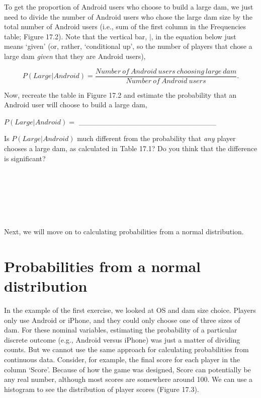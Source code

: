 \documentclass[
  openany]{krantz}
\begin{document}
To get the proportion of Android users who choose to build a large dam, we just need to divide the number of Android users who chose the large dam size by the total number of Android users (i.e., sum of the first column in the Frequencies table; Figure 17.2).
Note that the vertical bar, \(|\), in the equation below just means `given' (or, rather, `conditional up', so the number of players that chose a large dam \emph{given} that they are Android users),

\[P(Large | Android) = \frac{Number\:of\:Android\:users\:choosing\:large\:dam}{Number\:of\:Android\:users}.\]

Now, recreate the table in Figure 17.2 and estimate the probability that an Android user will choose to build a large dam,

\(P(Large | Android) =\) \_\_\_\_\_\_\_\_\_\_\_\_\_\_\_\_\_\_\_\_\_\_\_\_\_\_

Is \(P(Large | Android)\) much different from the probability that \emph{any} player chooses a large dam, as calculated in Table 17.1? Do you think that the difference is significant?

\begin{verbatim}






\end{verbatim}

Next, we will move on to calculating probabilities from a normal distribution.

\hypertarget{probabilities-from-a-normal-distribution}{%
\section{Probabilities from a normal distribution}\label{probabilities-from-a-normal-distribution}}

In the example of the first exercise, we looked at OS and dam size choice.
Players only use Android or iPhone, and they could only choose one of three sizes of dam.
For these nominal variables, estimating the probability of a particular discrete outcome (e.g., Android versus iPhone) was just a matter of dividing counts.
But we cannot use the same approach for calculating probabilities from continuous data.
Consider, for example, the final score for each player in the column `Score'.
Because of how the game was designed, Score can potentially be any real number, although most scores are somewhere around 100.
We can use a histogram to see the distribution of player scores (Figure 17.3).
\end{document}
